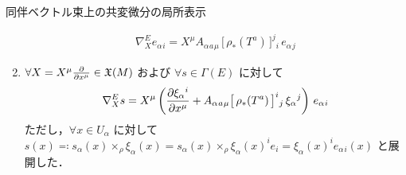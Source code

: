 \documentclass[TQFT_main]{subfiles}
\begin{document}
\begin{mytheo}[label=thm:codv-assoc-local,breakable]{同伴ベクトル束上の共変微分の局所表示}
\begin{enumerate}
        \begin{align}
            \nabla^E_X e_{\alpha}{}_i = X^\mu A_\alpha{}_a{}_\mu\, \bigl[\, \rho_*(T^a) \,\bigr]^j{}_i\, e_{\alpha}{}_j
        \end{align}
        \item $\forall X = X^\mu \pdv{}{x^\mu} \in \mathfrak{X}(M)$ および $\forall s \in \Gamma(E)$ に対して
        \begin{align}
            \nabla^E_X s = X^\mu \left( \pdv{\xi_\alpha{}^i}{x^\mu} + A_\alpha{}_a{}_\mu \bigl[ \,\rho_*(T^a) \,\bigr]^i{}_j\, \xi_\alpha{}^j  \right) \, e_{\alpha}{}_i
        \end{align}
        ただし，$\forall x \in U_\alpha$ に対して $s(x) \eqqcolon s_\alpha(x) \times_\rho \xi_\alpha (x) = s_\alpha(x) \times_\rho \xi_\alpha(x)^i e_i = \xi_\alpha(x)^i e_{\alpha}{}_i(x)$ と展開した．
    \end{enumerate}
\end{mytheo}
\end{document}
